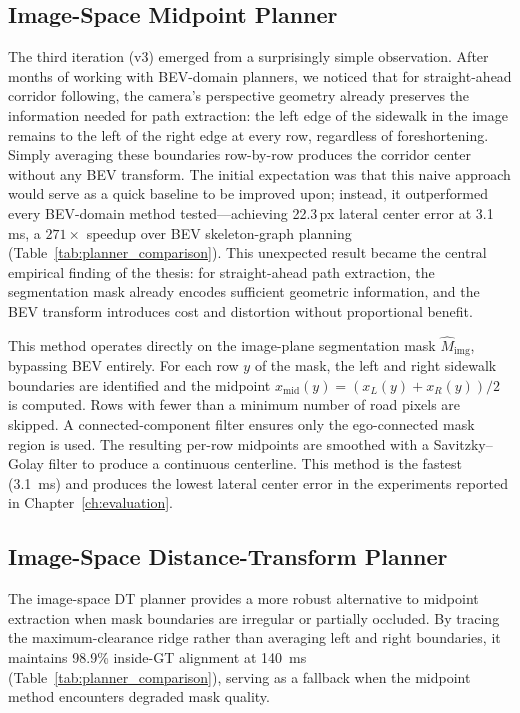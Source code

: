 \documentclass[12pt,letterpaper,oneside]{report}
\begin{document}
\subsection{Image-Space Midpoint Planner}
\label{sec:img_midpoint}

The third iteration (v3) emerged from a surprisingly simple observation.  After months of working with BEV-domain planners, we noticed that for straight-ahead corridor following, the camera's perspective geometry already preserves the information needed for path extraction: the left edge of the sidewalk in the image remains to the left of the right edge at every row, regardless of foreshortening.  Simply averaging these boundaries row-by-row produces the corridor center without any BEV transform.  The initial expectation was that this naive approach would serve as a quick baseline to be improved upon; instead, it outperformed every BEV-domain method tested---achieving 22.3\,px lateral center error at 3.1\,ms, a $271\times$ speedup over BEV skeleton-graph planning (Table~\ref{tab:planner_comparison}).  This unexpected result became the central empirical finding of the thesis: for straight-ahead path extraction, the segmentation mask already encodes sufficient geometric information, and the BEV transform introduces cost and distortion without proportional benefit.

This method operates directly on the image-plane segmentation mask $\widehat{M}_\text{img}$, bypassing BEV entirely. For each row $y$ of the mask, the left and right sidewalk boundaries are identified and the midpoint $x_\text{mid}(y) = (x_L(y) + x_R(y))/2$ is computed. Rows with fewer than a minimum number of road pixels are skipped. A connected-component filter ensures only the ego-connected mask region is used. The resulting per-row midpoints are smoothed with a Savitzky--Golay filter to produce a continuous centerline. This method is the fastest (\SI{3.1}{ms}) and produces the lowest lateral center error in the experiments reported in Chapter~\ref{ch:evaluation}.


\subsection{Image-Space Distance-Transform Planner}
\label{sec:img_dt}

The image-space DT planner provides a more robust alternative to midpoint extraction when mask boundaries are irregular or partially occluded. By tracing the maximum-clearance ridge rather than averaging left and right boundaries, it maintains 98.9\% inside-GT alignment at \SI{140}{ms} (Table~\ref{tab:planner_comparison}), serving as a fallback when the midpoint method encounters degraded mask quality.
\end{document}
